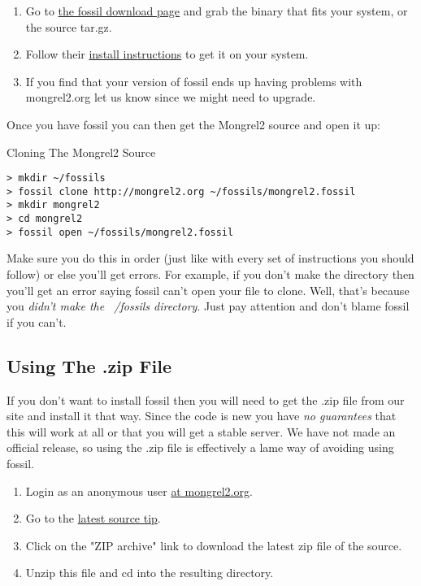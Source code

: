 \begin{enumerate}
\item Go to \href{http://www.fossil-scm.org/download.html}{the fossil download page} and
    grab the binary that fits your system, or the source tar.gz.
\item Follow their \href{http://fossil-scm.org/index.html/doc/tip/www/build.wiki}{install instructions}
    to get it on your system.
\item If you find that your version of fossil ends up having problems with mongrel2.org let us know since
    we might need to upgrade.
\end{enumerate}

Once you have fossil you can then get the Mongrel2 source and open it up:

\begin{code}{Cloning The Mongrel2 Source}
\begin{Verbatim}
> mkdir ~/fossils
> fossil clone http://mongrel2.org ~/fossils/mongrel2.fossil
> mkdir mongrel2
> cd mongrel2
> fossil open ~/fossils/mongrel2.fossil
\end{Verbatim}
\end{code}

Make sure you do this in order (just like with every set of instructions you should follow)
or else you'll get errors.  For example, if you don't make the  directory
then you'll get an error saying fossil can't open your file to clone.  Well, that's because
you \emph{didn't make the ~/fossils directory}.  Just pay attention and don't blame fossil
if you can't.


\subsection{Using The .zip File}

If you don't want to install fossil then you will need to get the .zip file
from our site and install it that way.  Since the code is new you have \emph{no guarantees}
that this will work at all or that you will get a stable server.  We have not made an
official release, so using the .zip file is effectively a lame way of avoiding using
fossil.

\begin{enumerate}
\item Login as an anonymous user \href{http://mongrel2.org/login}{at mongrel2.org}.
\item Go to the \href{http://mongrel2.org/info/tip}{latest source tip}.
\item Click on the "ZIP archive" link to download the latest zip file of the source.
\item Unzip this file and cd into the resulting directory.
\end{enumerate}


